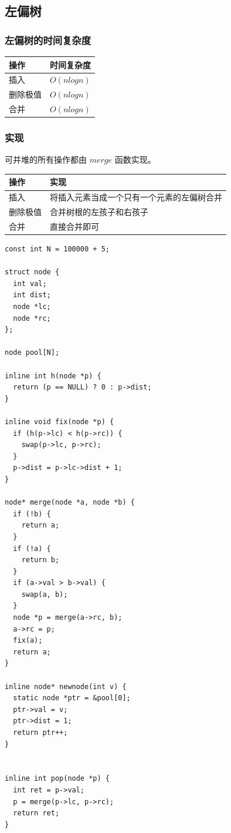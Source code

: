 \documentclass[11pt]{article}
\begin{document}
\subsection{左偏树}
\label{sec-4-5}

\subsubsection{左偏树的时间复杂度}
\label{sec-4-5-1}

\begin{center}
\begin{tabular}{ll}
操作 & 时间复杂度\\
\hline
插入 & $O(nlogn)$\\
删除极值 & $O(nlogn)$\\
合并 & $O(nlogn)$\\
\end{tabular}
\end{center}

\subsubsection{实现}
\label{sec-4-5-2}

可并堆的所有操作都由 $merge$ 函数实现。

\begin{center}
\begin{tabular}{ll}
操作 & 实现\\
\hline
插入 & 将插入元素当成一个只有一个元素的左偏树合并\\
删除极值 & 合并树根的左孩子和右孩子\\
合并 & 直接合并即可\\
\end{tabular}
\end{center}


\begin{verbatim}
const int N = 100000 + 5;

struct node {
  int val;
  int dist;
  node *lc;
  node *rc;
};

node pool[N];

inline int h(node *p) {
  return (p == NULL) ? 0 : p->dist;
}

inline void fix(node *p) {
  if (h(p->lc) < h(p->rc)) {
    swap(p->lc, p->rc);
  }
  p->dist = p->lc->dist + 1;
}

node* merge(node *a, node *b) {
  if (!b) {
    return a;
  }
  if (!a) {
    return b;
  }
  if (a->val > b->val) {
    swap(a, b);
  }
  node *p = merge(a->rc, b);
  a->rc = p;
  fix(a);
  return a;
}

inline node* newnode(int v) {
  static node *ptr = &pool[0];
  ptr->val = v;
  ptr->dist = 1;
  return ptr++;
}


inline int pop(node *p) {
  int ret = p->val;
  p = merge(p->lc, p->rc);
  return ret;
}
\end{verbatim}
\end{document}
